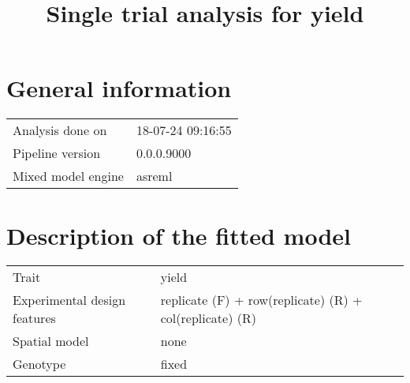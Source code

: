 \documentclass[a4paper,11pt]{article}\usepackage[]{graphicx}\usepackage[]{color}
\title{Single trial analysis for yield}%
\author{\vspace{-5ex}}
\date{\vspace{-5ex}}
\begin{document}
\maketitle

\singlespacing

\section{General information}
\begin{table}[ht]
\begin{flushleft}
\begin{tabular}{ll}
  Analysis done on & 18-07-24 09:16:55 \\ 
  Pipeline version & 0.0.0.9000 \\ 
  Mixed model engine & asreml \\ 
  \end{tabular}
\label{general}
\end{flushleft}
\end{table}


\section{Description of the fitted model}

\begin{table}[ht]
\begin{flushleft}
\begin{tabular}{ll}
  Trait & yield \\ 
  Experimental design features & replicate (F) + row(replicate) (R) + col(replicate) (R) \\ 
  Spatial model & none \\ 
  Genotype & fixed \\ 
  \end{tabular}
\label{modelDescription}
\end{flushleft}
\end{table}
\end{document}

